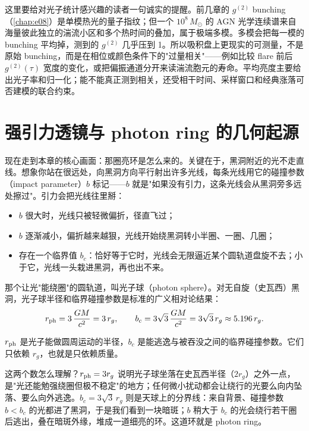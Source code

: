 这里要给对光子统计感兴趣的读者一句诚实的提醒。前几章的 \(g^{(2)}\) bunching（\ref{chap:e08}）是单模热光的量子指纹；但一个 \(10^8\,M_\odot\) 的 AGN 光学连续谱来自海量彼此独立的湍流小区和多个热时间的叠加，属于极端多模。多模会把每一模的 bunching 平均掉，测到的 \(g^{(2)}\) 几乎压到 1。所以吸积盘上更现实的可测量，不是原始 bunching，而是在相位或颜色条件下的"过量相关"——例如比较 flare 前后 \(g^{(2)}(\tau)\) 宽度的变化，或把偏振通道分开来读湍流胞元的寿命。平均亮度主要给出光子率和归一化；能不能真正测到相关，还受相干时间、采样窗口和经典涨落可否建模的联合约束。

\section{强引力透镜与 photon ring 的几何起源}
\label{sec:e19-geometry}

现在走到本章的核心画面：那圈亮环是怎么来的。关键在于，黑洞附近的光不走直线。想象你站在很远处，向黑洞方向平行射出许多光线，每条光线用它的碰撞参数（impact parameter）\(b\) 标记——\(b\) 就是"如果没有引力，这条光线会从黑洞旁多远处擦过"。引力会把光线往里掰：
\begin{itemize}
\item \(b\) 很大时，光线只被轻微偏折，径直飞过；
\item \(b\) 逐渐减小，偏折越来越狠，光线开始绕黑洞转小半圈、一圈、几圈；
\item 存在一个临界值 \(b_c\)：恰好等于它时，光线会无限逼近某个圆轨道盘旋不去；小于它，光线一头栽进黑洞，再也出不来。
\end{itemize}
那个让光"能绕圈"的圆轨道，叫光子球（photon sphere）。对无自旋（史瓦西）黑洞，光子球半径和临界碰撞参数是标准的广义相对论结果：
\begin{equation}
  r_{\rm ph}=3\,\frac{GM}{c^2}=3\,r_g,\qquad
  b_c=3\sqrt{3}\,\frac{GM}{c^2}=3\sqrt{3}\,r_g\approx5.196\,r_g.
  \label{eq:e19-photonsphere}
\end{equation}
\begin{formulaexplain}
\(r_{\rm ph}\) 是光子能做圆周运动的半径，\(b_c\) 是能逃逸与被吞没之间的临界碰撞参数。它们只依赖 \(r_g\)，也就是只依赖质量。
\end{formulaexplain}
这两个数怎么理解？\(r_{\rm ph}=3r_g\) 说明光子球坐落在史瓦西半径（\(2r_g\)）之外一点，是"光还能勉强绕圈但极不稳定"的地方；任何微小扰动都会让绕行的光要么向内坠落、要么向外逃逸。\(b_c=3\sqrt3\,r_g\) 则是天球上的分界线：来自背景、碰撞参数 \(b<b_c\) 的光都进了黑洞，于是我们看到一块暗斑；\(b\) 稍大于 \(b_c\) 的光会绕行若干圈后逃出，叠在暗斑外缘，堆成一道细亮的环。这道环就是 photon ring。

